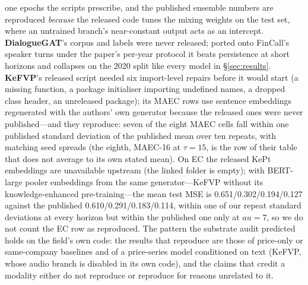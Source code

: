 one epochs the scripts prescribe, and the published ensemble numbers are reproduced
\emph{because} the released code tunes the mixing weights on the test set, where an
untrained branch's near-constant output acts as an intercept. \textbf{DialogueGAT}'s
corpus and labels were never released; ported onto FinCall's speaker turns under the
paper's per-year protocol it beats persistence at short horizons and collapses on the
2020 split like every model in \S\ref{sec:results}. \textbf{KeFVP}'s released script
needed six import-level repairs before it would start (a missing function, a package
initialiser importing undefined names, a dropped class header, an unreleased package);
its MAEC rows use sentence embeddings regenerated with the authors' own generator
because the released ones were never published---and they reproduce: seven of the
eight MAEC cells fall within one published standard deviation of the published mean
over ten repeats, with matching seed spreads (the eighth, MAEC-16 at $\tau{=}15$, is
the row of their table that does not average to its own stated mean). On EC the released KePt embeddings are unavailable upstream (the linked folder is
empty); with BERT-large pooler embeddings from the same generator---KeFVP without its
knowledge-enhanced pre-training---the mean test MSE is 0.651/0.302/0.194/0.127 against
the published 0.610/0.291/0.183/0.114, within one of our repeat standard deviations at
every horizon but within the published one only at $	au{=}7$, so we do not count the
EC row as reproduced. The pattern the substrate audit
predicted holds on the field's own code: the results that reproduce are those of
price-only or same-company baselines and of a price-series model conditioned on
text (KeFVP, whose audio branch is disabled in its own code), and the claims that
credit a modality either do not reproduce or reproduce for reasons unrelated to it.



